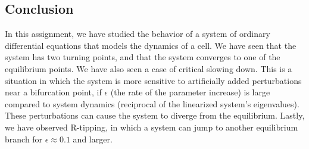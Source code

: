 \subsection{Conclusion}
In this assignment, we have studied the behavior of a system of ordinary differential equations that models the dynamics of a cell. 
We have seen that the system has two turning points, and that the system converges to one of the equilibrium points.
We have also seen a case of critical slowing down. This is a situation in which the system is more sensitive to artificially added perturbations near a bifurcation point, if $\epsilon$ (the rate of the parameter increase) is large 
compared to system dynamics (reciprocal of the linearized system's eigenvalues). These perturbations can cause the system to diverge from the equilibrium.
Lastly, we have observed R-tipping, in which a system can jump to another equilibrium branch for $\epsilon \approx 0.1$ and larger. 